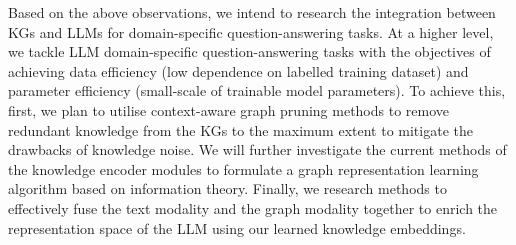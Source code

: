 Based on the above observations, we intend to research the integration between KGs and LLMs for domain-specific question-answering tasks. 
At a higher level, we tackle LLM domain-specific question-answering tasks with the objectives of achieving data efficiency (low dependence on labelled training dataset) and parameter efficiency (small-scale of trainable model parameters).
To achieve this, first, we plan to utilise context-aware graph pruning methods to remove redundant knowledge from the KGs to the maximum extent to mitigate the drawbacks of knowledge noise. 
We will further investigate the current methods of the knowledge encoder modules to formulate a graph representation learning algorithm based on information theory. 
Finally, we research methods to effectively fuse the text modality and the graph modality together to enrich the representation space of the LLM using our learned knowledge embeddings.
